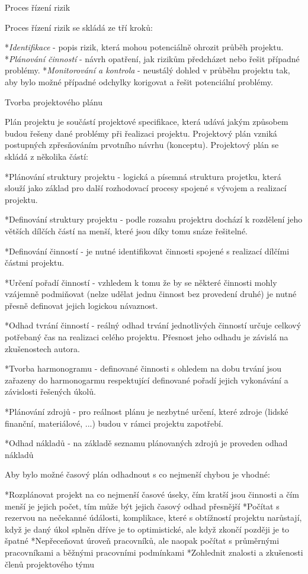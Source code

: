 \secc Proces řízení rizik

Proces řízení rizik se skládá ze tří kroků:

\begitems
*{\it Identifikace} - popis rizik, která mohou potenciálně ohrozit průběh projektu.
*{\it Plánování činností} - návrh opatření, jak rizikům předcházet nebo řešit případné problémy.
*{\it Monitorování a kontrola} - neustálý dohled v průběhu projektu tak, aby bylo možné případné odchylky korigovat a řešit potenciální problémy.
\enditems

\sec Tvorba projektového plánu

Plán projektu je součástí projektové specifikace, která udává jakým způsobem budou řešeny dané problémy při řealizaci projektu. Projektový plán vzniká postupných zpřesňováním prvotního návrhu (konceptu). Projektový plán se skládá z několika částí:

\begitems
*Plánování struktury projektu - logická a písemná struktura projetku, která slouží jako základ pro další rozhodovací procesy spojené s vývojem a realizací projektu.

*Definování struktury projektu - podle rozsahu projektru dochází k rozdělení jeho větších dílčích částí na menší, které jsou díky tomu snáze řešitelné.

*Definování činností - je nutné identifikovat činnosti spojené s realizací dílčími částmi projektu.

*Určení pořadí činností - vzhledem k tomu že by se některé činnosti mohly vzájemně podmiňovat (nelze udělat jednu činnost bez provedení druhé) je nutné přesně definovat jejich logickou návaznost.

*Odhad tvrání činností - reálný odhad trvání jednotlivých činností určuje celkový potřebaný čas na realizaci celého projektu. Přesnost jeho odhadu je závislá na zkušenostech autora.

*Tvorba harmonogramu - definované činnosti s ohledem na dobu trvání jsou zařazeny do harmonogarmu respektující definované pořadí jejich vykonávání a závislosti řešených úkolů.

*Plánování zdrojů - pro reálnost plánu je nezbytné určení, které zdroje (lidské finanční, materiálové, ...) budou v rámci projektu zapotřebí.

*Odhad nákladů - na základě seznamu plánovaných zdrojů je proveden odhad nákladů
\enditems

Aby bylo možné časový plán odhadnout s co nejmenší chybou je vhodné:

\begitems
*Rozplánovat projekt na co nejmenší časové úseky, čím kratší jsou činnosti a čím menší je jejich počet, tím může být jejich časový odhad přesnější
*Počítat s rezervou na nečekanné údálosti, komplikace, které s obtížností projektu narůstají, když je daný úkol splněn dříve je to optimistické, ale když zkončí později je to špatné
*Nepřeceňovat úroveň pracovníků, ale naopak počítat s průměrnými pracovníkami a běžnými pracovními podmínkami
*Zohlednit znalosti a zkušenosti členů projektového týmu
\enditems

